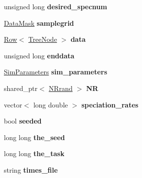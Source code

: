 \begin{DoxyCompactItemize}
\item 
unsigned long {\bfseries desired\+\_\+specnum}\hypertarget{class_spatial_tree_a694c7eb6c70687ea87e49066a8957877}{}\label{class_spatial_tree_a694c7eb6c70687ea87e49066a8957877}

\item 
\hyperlink{class_data_mask}{Data\+Mask} {\bfseries samplegrid}\hypertarget{class_spatial_tree_ad902e850c9573b5c26ef6d77a203f72d}{}\label{class_spatial_tree_ad902e850c9573b5c26ef6d77a203f72d}

\item 
\hyperlink{class_row}{Row}$<$ \hyperlink{class_tree_node}{Tree\+Node} $>$ {\bfseries data}\hypertarget{class_tree_a5983af6c56e41be51be0766941093b4b}{}\label{class_tree_a5983af6c56e41be51be0766941093b4b}

\item 
unsigned long {\bfseries enddata}\hypertarget{class_tree_a50344999e6b64d15eef935b1f6023471}{}\label{class_tree_a50344999e6b64d15eef935b1f6023471}

\item 
\hyperlink{struct_sim_parameters}{Sim\+Parameters} {\bfseries sim\+\_\+parameters}\hypertarget{class_tree_a63c399793a209332ad0f5da7fc830d56}{}\label{class_tree_a63c399793a209332ad0f5da7fc830d56}

\item 
shared\+\_\+ptr$<$ \hyperlink{class_n_rrand}{N\+Rrand} $>$ {\bfseries NR}\hypertarget{class_tree_a20790866da998f8cb7d0f1455d9fbcc5}{}\label{class_tree_a20790866da998f8cb7d0f1455d9fbcc5}

\item 
vector$<$ long double $>$ {\bfseries speciation\+\_\+rates}\hypertarget{class_tree_a61b4349fe78d09ac06eff4b7d6833105}{}\label{class_tree_a61b4349fe78d09ac06eff4b7d6833105}

\item 
bool {\bfseries seeded}\hypertarget{class_tree_a78935befd45946b8e69023bffca59c1d}{}\label{class_tree_a78935befd45946b8e69023bffca59c1d}

\item 
long long {\bfseries the\+\_\+seed}\hypertarget{class_tree_acf483ed0a44629c9aa4690a08017ee35}{}\label{class_tree_acf483ed0a44629c9aa4690a08017ee35}

\item 
long long {\bfseries the\+\_\+task}\hypertarget{class_tree_a9f74137d5c9c5529ec9a06f88dfa6960}{}\label{class_tree_a9f74137d5c9c5529ec9a06f88dfa6960}

\item 
string {\bfseries times\+\_\+file}\hypertarget{class_tree_a5e031ea8d94f48288547116a9e7d7add}{}\label{class_tree_a5e031ea8d94f48288547116a9e7d7add}


\end{DoxyCompactItemize}
